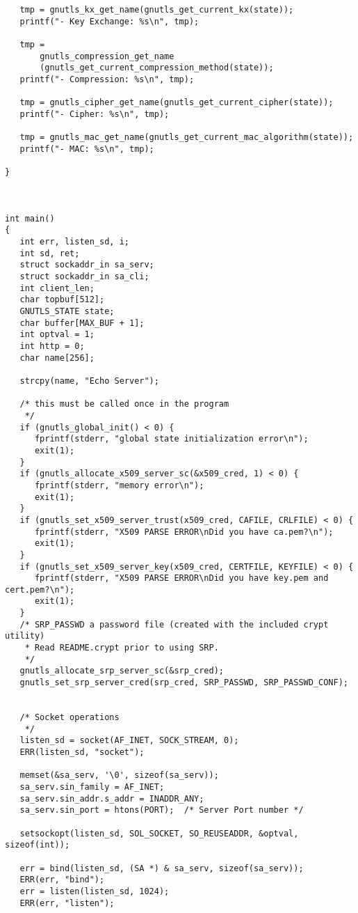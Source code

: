 \begin{verbatim}
   tmp = gnutls_kx_get_name(gnutls_get_current_kx(state));
   printf("- Key Exchange: %s\n", tmp);

   tmp =
       gnutls_compression_get_name
       (gnutls_get_current_compression_method(state));
   printf("- Compression: %s\n", tmp);

   tmp = gnutls_cipher_get_name(gnutls_get_current_cipher(state));
   printf("- Cipher: %s\n", tmp);

   tmp = gnutls_mac_get_name(gnutls_get_current_mac_algorithm(state));
   printf("- MAC: %s\n", tmp);

}



int main()
{
   int err, listen_sd, i;
   int sd, ret;
   struct sockaddr_in sa_serv;
   struct sockaddr_in sa_cli;
   int client_len;
   char topbuf[512];
   GNUTLS_STATE state;
   char buffer[MAX_BUF + 1];
   int optval = 1;
   int http = 0;
   char name[256];

   strcpy(name, "Echo Server");

   /* this must be called once in the program
    */
   if (gnutls_global_init() < 0) {
      fprintf(stderr, "global state initialization error\n");
      exit(1);
   }
   if (gnutls_allocate_x509_server_sc(&x509_cred, 1) < 0) {
      fprintf(stderr, "memory error\n");
      exit(1);
   }
   if (gnutls_set_x509_server_trust(x509_cred, CAFILE, CRLFILE) < 0) {
      fprintf(stderr, "X509 PARSE ERROR\nDid you have ca.pem?\n");
      exit(1);
   }
   if (gnutls_set_x509_server_key(x509_cred, CERTFILE, KEYFILE) < 0) {
      fprintf(stderr, "X509 PARSE ERROR\nDid you have key.pem and cert.pem?\n");
      exit(1);
   }
   /* SRP_PASSWD a password file (created with the included crypt utility) 
    * Read README.crypt prior to using SRP.
    */
   gnutls_allocate_srp_server_sc(&srp_cred);
   gnutls_set_srp_server_cred(srp_cred, SRP_PASSWD, SRP_PASSWD_CONF);


   /* Socket operations
    */
   listen_sd = socket(AF_INET, SOCK_STREAM, 0);
   ERR(listen_sd, "socket");

   memset(&sa_serv, '\0', sizeof(sa_serv));
   sa_serv.sin_family = AF_INET;
   sa_serv.sin_addr.s_addr = INADDR_ANY;
   sa_serv.sin_port = htons(PORT);  /* Server Port number */

   setsockopt(listen_sd, SOL_SOCKET, SO_REUSEADDR, &optval, sizeof(int));

   err = bind(listen_sd, (SA *) & sa_serv, sizeof(sa_serv));
   ERR(err, "bind");
   err = listen(listen_sd, 1024);
   ERR(err, "listen");


\end{verbatim}
